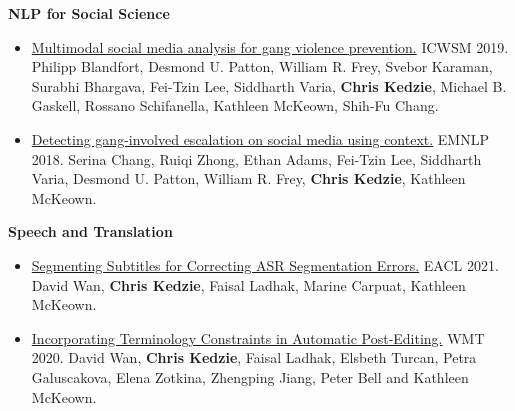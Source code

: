 \documentclass[letterpaper,11pt]{article}
\begin{document}
\textbf{NLP for Social Science} \\
\begin{itemize}[leftmargin=6.0mm]
\item \href{https://www.aaai.org/ojs/index.php/ICWSM/article/download/3214/3082}{Multimodal social media analysis for gang violence prevention.} ICWSM 2019.
Philipp Blandfort, Desmond U. Patton, William R. Frey, Svebor Karaman, Surabhi Bhargava, Fei-Tzin Lee, Siddharth Varia, \textbf{Chris Kedzie}, Michael B. Gaskell, Rossano Schifanella, Kathleen McKeown, Shih-Fu Chang. 
\item \href{https://arxiv.org/pdf/1809.03632}{Detecting gang-involved escalation on social media using context.} EMNLP 2018.
Serina Chang, Ruiqi Zhong, Ethan Adams, Fei-Tzin Lee, Siddharth Varia, Desmond U. Patton, William R. Frey, \textbf{Chris Kedzie}, Kathleen McKeown. 
\end{itemize}




\textbf{Speech and Translation}\\
\begin{itemize}[leftmargin=6.0mm]
\item \href{https://aclanthology.org/2021.eacl-main.248.pdf}{Segmenting Subtitles for Correcting ASR Segmentation Errors.} EACL 2021.
David Wan, \textbf{Chris Kedzie}, Faisal Ladhak, Marine Carpuat, Kathleen McKeown.
\item \href{http://www.statmt.org/wmt20/pdf/2020.wmt-1.141.pdf}{Incorporating Terminology Constraints in Automatic Post-Editing.} WMT 2020.
David Wan, \textbf{Chris Kedzie}, Faisal Ladhak, Elsbeth Turcan, Petra Galuscakova, Elena Zotkina, Zhengping Jiang, Peter Bell and Kathleen McKeown.
\end{itemize}







\end{document}

